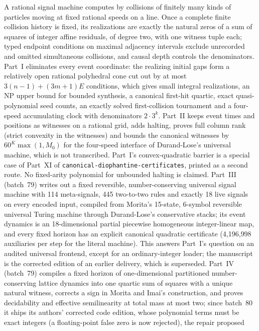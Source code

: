 \documentclass[11pt]{article}
\newcommand{\dir}[1]{\texttt{#1}}
\begin{document}
{A rational signal machine computes by collisions of finitely many kinds of
particles moving at fixed rational speeds on a line.  Once a complete finite
collision history is fixed, its realizations are exactly the natural zeros
of a sum of squares of integer affine residuals, of degree two, with one
witness tuple each; typed endpoint conditions on maximal adjacency
intervals exclude unrecorded and omitted simultaneous collisions, and causal
depth controls the denominators.  Part~I eliminates every event coordinate:
the realizing initial gaps form a relatively open rational polyhedral cone
cut out by at most $3(n-1)+(3m+1)E$ conditions, which gives small integral
realizations, an NP upper bound for bounded synthesis, a canonical
first-hit quartic, exact quasi-polynomial seed counts, an exactly solved
first-collision tournament and a four-speed accumulating clock with
denominators $2\cdot3^k$.  Part~II keeps event times and positions as
witnesses on a rational grid, adds halting, proves full column rank (strict
convexity in the witnesses) and bounds the canonical witnesses by
$60^K\max(1,M_0)$ for the four-speed interface of Durand-Lose's universal
machine, which is not transcribed.  Part~I's convex-quadratic barrier is a
special case of Part~XI of \dir{canonical-diophantine-certificates}, printed
as a second route.  No fixed-arity polynomial for unbounded halting is
claimed.  Part~III (batch~79) writes out a fixed reversible,
number-conserving universal signal machine with 114 meta-signals, 445
two-to-two rules and exactly 18 live signals on every encoded input,
compiled from Morita's 15-state, 6-symbol reversible universal Turing
machine through Durand-Lose's conservative stacks; its event dynamics is an
18-dimensional partial piecewise homogeneous integer-linear map, and every
fixed horizon has an explicit canonical quadratic certificate (4{,}196{,}998
auxiliaries per step for the literal machine).  This answers Part~I's
question on an audited universal frontend, except for an ordinary-integer
loader; the manuscript is the corrected edition of an earlier delivery,
which is superseded.  Part~IV (batch~79) compiles a fixed horizon of
one-dimensional partitioned number-conserving lattice dynamics into one
quartic sum of squares with a unique natural witness, corrects a sign in
Morita and Imai's construction, and proves decidability and effective
semilinearity at total mass at most two; since batch~80 it ships its
authors' corrected code edition, whose polynomial terms must be exact
integers (a floating-point false zero is now rejected), the repair proposed
}
\end{document}
